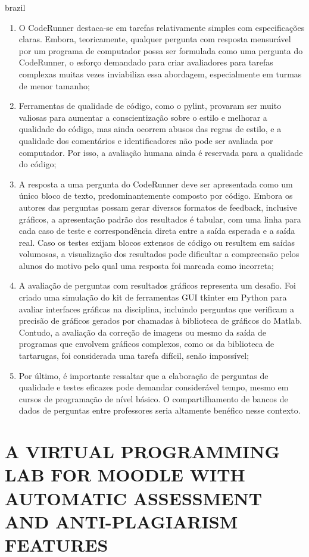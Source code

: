 \begin{otherlanguage*}{brazil}
\begin{enumerate} [label=(\alph*)]
    \item O CodeRunner destaca-se em tarefas relativamente simples com especificações claras. Embora, teoricamente, qualquer pergunta com resposta mensurável por um programa de computador possa ser formulada como uma pergunta do CodeRunner, o esforço demandado para criar avaliadores para tarefas complexas muitas vezes inviabiliza essa abordagem, especialmente em turmas de menor tamanho;
    \item Ferramentas de qualidade de código, como o pylint, provaram ser muito valiosas para aumentar a conscientização sobre o estilo e melhorar a qualidade do código, mas ainda ocorrem abusos das regras de estilo, e a qualidade dos comentários e identificadores não pode ser avaliada por computador. Por isso, a avaliação humana ainda é reservada para a qualidade do código;
    \item A resposta a uma pergunta do CodeRunner deve ser apresentada como um único bloco de texto, predominantemente composto por código. Embora os autores das perguntas possam gerar diversos formatos de feedback, inclusive gráficos, a apresentação padrão dos resultados é tabular, com uma linha para cada caso de teste e correspondência direta entre a saída esperada e a saída real. Caso os testes exijam blocos extensos de código ou resultem em saídas volumosas, a visualização dos resultados pode dificultar a compreensão pelos alunos do motivo pelo qual uma resposta foi marcada como incorreta;
    \item A avaliação de perguntas com resultados gráficos representa um desafio. Foi criado uma simulação do kit de ferramentas GUI tkinter em Python para avaliar interfaces gráficas na disciplina, incluindo perguntas que verificam a precisão de gráficos gerados por chamadas à biblioteca de gráficos do Matlab. Contudo, a avaliação da correção de imagens ou mesmo da saída de programas que envolvem gráficos complexos, como os da biblioteca de tartarugas, foi considerada uma tarefa difícil, senão impossível;
    \item Por último, é importante ressaltar que a elaboração de perguntas de qualidade e testes eficazes pode demandar considerável tempo, mesmo em cursos de programação de nível básico. O compartilhamento de bancos de dados de perguntas entre professores seria altamente benéfico nesse contexto.
\end{enumerate}


\section{A VIRTUAL PROGRAMMING LAB FOR MOODLE WITH AUTOMATIC ASSESSMENT AND ANTI-PLAGIARISM FEATURES}


\end{otherlanguage*}
